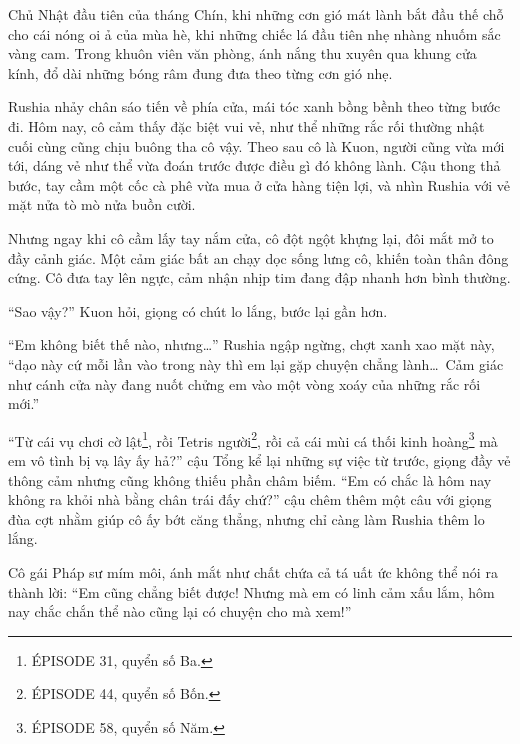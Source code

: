 \documentclass[../main.tex]{subfiles}
\begin{document}

Chủ Nhật đầu tiên của tháng Chín, khi những cơn gió mát lành bắt đầu thế chỗ cho cái nóng oi ả của mùa hè, khi những chiếc lá đầu tiên nhẹ nhàng nhuốm sắc vàng cam. Trong khuôn viên văn phòng, ánh nắng thu xuyên qua khung cửa kính, đổ dài những bóng râm đung đưa theo từng cơn gió nhẹ.

Rushia nhảy chân sáo tiến về phía cửa, mái tóc xanh bồng bềnh theo từng bước đi. Hôm nay, cô cảm thấy đặc biệt vui vẻ, như thể những rắc rối thường nhật cuối cùng cũng chịu buông tha cô vậy. Theo sau cô là Kuon, người cũng vừa mới tới, dáng vẻ như thể vừa đoán trước được điều gì đó không lành. Cậu thong thả bước, tay cầm một cốc cà phê vừa mua ở cửa hàng tiện lợi, và nhìn Rushia với vẻ mặt nửa tò mò nửa buồn cười.


Nhưng ngay khi cô cầm lấy tay nắm cửa, cô đột ngột khựng lại, đôi mắt mở to đầy cảnh giác. Một cảm giác bất an chạy dọc sống lưng cô, khiến toàn thân đông cứng. Cô đưa tay lên ngực, cảm nhận nhịp tim đang đập nhanh hơn bình thường.

``Sao vậy?'' Kuon hỏi, giọng có chút lo lắng, bước lại gần hơn.

``Em không biết thế nào, nhưng\dots'' Rushia ngập ngừng, chợt xanh xao mặt này, ``dạo này cứ mỗi lần vào trong này thì em lại gặp chuyện chẳng lành\dots\ Cảm giác như cánh cửa này đang nuốt chửng em vào một vòng xoáy của những rắc rối mới.''

``Từ cái vụ chơi cờ lật\footnote{{\flaregothic ÉPISODE 31}, quyển số Ba.}, rồi Tetris người\footnote{{\flaregothic ÉPISODE 44}, quyển số Bốn.}, rồi cả cái mùi cá thối kinh hoàng\footnote{{\flaregothic ÉPISODE 58}, quyển số Năm.} mà em vô tình bị vạ lây ấy hả?'' cậu Tổng kể lại những sự việc từ trước, giọng đầy vẻ thông cảm nhưng cũng không thiếu phần châm biếm. ``Em có chắc là hôm nay không ra khỏi nhà bằng chân trái đấy chứ?'' cậu chêm thêm một câu với giọng đùa cợt nhằm giúp cô ấy bớt căng thẳng, nhưng chỉ càng làm Rushia thêm lo lắng.

Cô gái Pháp sư mím môi, ánh mắt như chất chứa cả tá uất ức không thể nói ra thành lời: ``Em cũng chẳng biết được! Nhưng mà em có linh cảm xấu lắm, hôm nay chắc chắn thể nào cũng lại có chuyện cho mà xem!''
\end{document}
